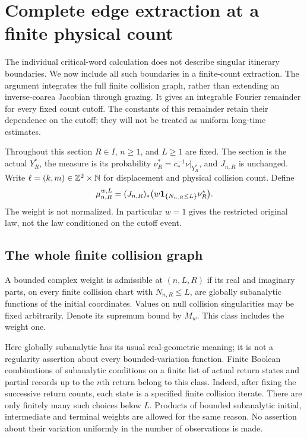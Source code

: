 \section{Complete edge extraction at a finite physical count}
\label{sec:finite-count-extraction}
The individual critical-word calculation does not describe singular
itinerary boundaries. We now include all such boundaries in a finite-count
extraction. The argument integrates the full finite collision graph,
rather than extending an inverse-coarea Jacobian through grazing.
It gives an integrable Fourier remainder for every fixed count cutoff.
The constants of this remainder retain their dependence on the cutoff;
they will not be treated as uniform long-time estimates.

Throughout this section $R\in I$, $n\ge1$, and $L\ge1$ are fixed.
The section is the actual $Y_R^*$, the measure is its probability
$\nu_R^*=c_*^{-1}\nu|_{Y_R^*}$, and $J_{n,R}$ is unchanged. Write
$\ell=(k,m)\in\mathbb Z^2\times\mathbb N$ for displacement and physical
collision count. Define
\begin{equation}\label{eq:finite-count-measure}
 \mu_{n,R}^{w,L}=(J_{n,R})_*
       \bigl(w\one_{\{N_{n,R}\le L\}}\nu_R^*\bigr).
\end{equation}
The weight is not normalized. In particular $w=1$ gives the restricted
original law, not the law conditioned on the cutoff event.

\subsection{The whole finite collision graph}
\begin{definition}
\label{def:finite-record-weight}
A bounded complex weight is admissible at $(n,L,R)$ if its real and
imaginary parts, on every finite collision chart with $N_{n,R}\le L$,
are globally subanalytic functions of the initial coordinates. Values
on null collision singularities may be fixed arbitrarily. Denote its
supremum bound by $M_w$. This class includes the weight one.
\end{definition}
Here globally subanalytic has its usual real-geometric meaning; it is
not a regularity assertion about every bounded-variation function.
Finite Boolean combinations of subanalytic conditions on a finite list
of actual return states and partial records up to the $n$th return
belong to this class.
Indeed, after fixing the successive return counts, each state is a
specified finite collision iterate. There are only finitely many such
choices below $L$. Products of bounded subanalytic initial, intermediate
and terminal weights are allowed for the same reason. No assertion
about their variation uniformly in the number of observations is made.

